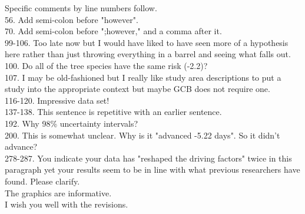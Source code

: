 \documentclass[11pt,a4paper]{article}
\begin{document}
Specific comments by line numbers follow.\\

56. Add semi-colon before "however".\\

70. Add semi-colon before ";however," and a comma after it.\\

99-106. Too late now but I would have liked to have seen more of a hypothesis here rather than just throwing everything in a barrel and seeing what falls out.\\

100.  Do all of the tree species have the same risk (-2.2)?\\

107.  I may be old-fashioned but I really like study area descriptions to put a study into the appropriate  context but maybe GCB does not require one. \\

116-120.  Impressive data set!\\

137-138. This sentence is repetitive with an earlier sentence.\\

 192.  Why 98\% uncertainty intervals? \\

200.  This is somewhat unclear.  Why is it "advanced -5.22 days".  So it didn’t advance?\\

 278-287.  You indicate your data has "reshaped the driving factors" twice in this paragraph yet your results seem to be in line with what previous researchers have found.  Please clarify.   \\
 
The graphics are informative.\\

I wish you well with the revisions.
\end{document}
